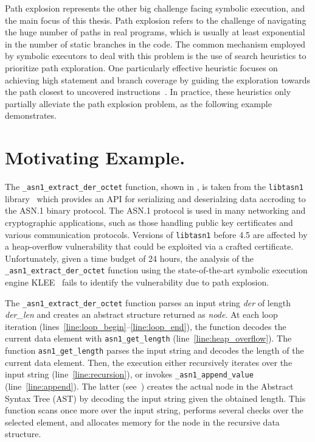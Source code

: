 Path explosion represents the other big challenge facing symbolic execution,
and the main focus of this thesis.
Path explosion refers to the challenge of navigating the huge number of paths in real programs,
which is usually at least exponential in the number of static branches in the code.
The common mechanism employed by symbolic executors to
deal with this problem is the use of search heuristics to prioritize path exploration.
One particularly effective heuristic focuses on
achieving high statement and branch coverage by guiding the
exploration towards the path closest to uncovered
instructions~\cite{exe,klee,sen:concolicheuristics,fitsymex:dsn09}.
In practice, these heuristics only partially alleviate the path
explosion problem, as the following example demonstrates.

\section{Motivating Example.}
The \texttt{\_asn1\_extract\_der\_octet} function, shown in ,
is taken from the \texttt{libtasn1} library~\cite{libtasn1}
which provides an API for serializing and deserialzing data accroding to the ASN.1 binary protocol.
The ASN.1 protocol is used in many networking and
cryptographic applications, such as those handling public key
certificates and various communication protocols.
Versions of \texttt{libtasn1} before 4.5 are affected by a heap-overflow 
vulnerability \cite{CVE-2015-3622} that could be exploited via a crafted certificate.
Unfortunately, given a time budget of 24 hours,
the analysis of the \texttt{\_asn1\_extract\_der\_octet} function using
the state-of-the-art symbolic execution engine KLEE~\cite{klee} fails
to identify the vulnerability due to path explosion.

The \texttt{\_asn1\_extract\_der\_octet} function parses an input string \textit{der}
of length \textit{der\_len} and creates an abstract structure returned as \textit{node}.
At each loop iteration (lines~\ref{line:loop_begin}--\ref{line:loop_end}),
the function decodes the current data element with \texttt{asn1\_get\_length} (line~\ref{line:heap_overflow}).
The function \texttt{asn1\_get\_length} parses the input string and decodes the length of the current data element.
Then, the execution either recursively iterates over the input string (line~\ref{line:recursion}),
or invokes \texttt{\_asn1\_append\_value} (line~\ref{line:append}).
The latter (see~) creates the
actual node in the Abstract Syntax Tree (AST) by decoding the input
string given the obtained length. This function scans once more over
the input string, performs several checks over the selected element,
and allocates memory for the node in the recursive data structure.

